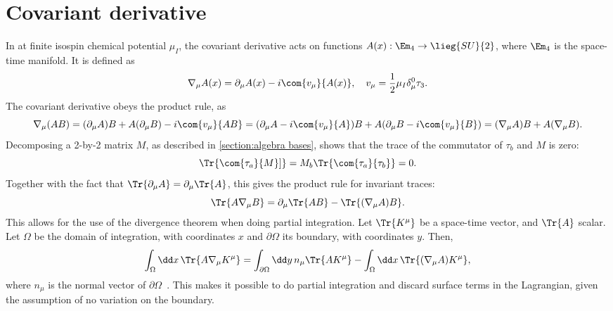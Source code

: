 \section{Covariant derivative}

In \chpt at finite isospin chemical potential $\mu_I$, the covariant derivative acts on functions $A(x): \Em_4 \rightarrow \lieg{SU}{2}$, where $\Em_4$ is the space-time manifold. It is defined as 
\begin{equation}
    \nabla_\mu A(x) = \partial_\mu A(x) - i \com{v_\mu}{A(x)}, 
    \quad v_\mu = \frac{1}{2} \mu_I \delta_\mu^0 \tau_3.
\end{equation}
The covariant derivative obeys the product rule, as
\begin{equation*}
    \nabla_\mu (A B) 
    = (\partial_\mu A) B + A (\partial_\mu B) - i \com{v_\mu}{AB}
    = (\partial_\mu A - i \com{v_\mu}{A})B + A(\partial_\mu B- i \com{v_\mu}{B}) 
    = (\nabla_\mu A)B + A (\nabla_\mu B).
\end{equation*}
Decomposing a 2-by-2 matrix $M$, as described in \autoref{section:algebra bases}, shows that the trace of the commutator of $\tau_b$ and $M$ is zero:
\begin{equation*}
    \Tr{\com{\tau_a}{M}]} = M_b\Tr{ \com{\tau_a}{\tau_b}} = 0.
\end{equation*}
Together with the fact that $\Tr{\partial_\mu A} = \partial_\mu \Tr{A}$, this gives the product rule for invariant traces:
\begin{equation*}
    \Tr{A \nabla_\mu B} = \partial_\mu \Tr{AB} - \Tr{(\nabla_\mu A) B}.
\end{equation*}
This allows for the use of the divergence theorem when doing partial integration.
Let $\Tr{K^\mu}$ be a space-time vector, and $\Tr{A}$ scalar. 
Let $\Omega$ be the domain of integration, with coordinates $x$ and $\partial \Omega$ its boundary, with coordinates $y$. Then, 
\begin{align*}
    \int_\Omega \dd x \, \Tr{A \nabla_\mu K^\mu} = \int_{\partial\Omega} \dd y\, n_\mu \Tr{A K^\mu} - \int_\Omega \dd x \, \Tr{(\nabla_\mu A) K^\mu},
\end{align*}
where $n_\mu$ is the normal vector of $\partial \Omega$~\cite{Carroll:spacetime}.
This makes it possible to do partial integration and discard surface terms in the \chpt Lagrangian, given the assumption of no variation on the boundary.
